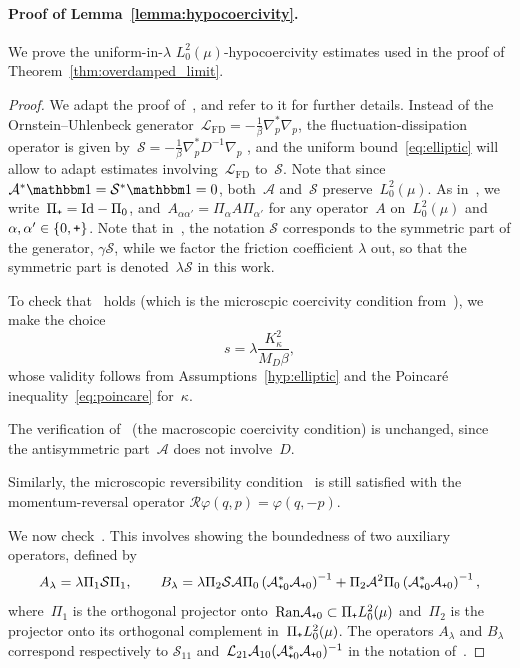 \documentclass[10pt]{article}
\newcommand{\cL}{\mathcal{L}}
\newcommand{\cR}{\mathcal{R}}
\newcommand{\cA}{\mathcal{A}}
\newcommand{\cS}{\mathcal{S}}
\newcommand{\cLham}{\mathcal A}
\newcommand{\cLou}{\mathcal S}
\newcommand{\wLmuz}{L^2_0(\mu)}
\newcommand{\subplus}{\textnormal{\texttt{+}}}
\newcommand{\1}{\mathbbm 1}
\newcommand{\Id}{\mathrm{Id}}
\begin{document}
\paragraph{Proof of Lemma~\ref{lemma:hypocoercivity}.}
We prove the uniform-in-$\lambda$ $\wLmuz$-hypocoercivity estimates used in the proof of Theorem~\ref{thm:overdamped_limit}.
\begin{proof}
    We adapt the proof of~\cite[Theorem 3.3]{BFLS22}, and refer to it for further details. Instead of the Ornstein--Uhlenbeck generator~$\mathcal L_{\mathrm{FD}} = -\frac1\beta\nabla_p^*\nabla_p$, the fluctuation-dissipation operator is given by~$\cLou = -\frac1\beta\nabla_p^* D^{-1}\nabla_p$ , and the uniform bound~\eqref{eq:elliptic} will allow to adapt estimates involving~$\cL_{\mathrm{FD}}$ to~$\cLou$.
    Note that since~$\cLham^* \1 = \cLou^* \1 = 0$, both~$\cLham$ and~$\cLou$ preserve~$\wLmuz$.
    As in~\cite{BFLS22}, we write~$\Pi_{\subplus}=\Id-\Pi_0$, and~$A_{\alpha\alpha'}=\Pi_\alpha A\Pi_{\alpha'}$ for any operator~$A$ on~$\wLmuz$ and~$\alpha,\alpha'\in\{0,\subplus\}$. Note that in~\cite[Theorem 3.3]{BFLS22}, the notation $\cS$ corresponds to the symmetric part of the generator, $\gamma\cLou$, while we factor the friction coefficient $\lambda$ out, so that the symmetric part is denoted~$\lambda\cS$ in this work.
    
    To check that~\cite[Assumption 2.2]{BFLS22} holds (which is the microscpic coercivity condition from~\cite{DMS15}), we make the choice
    \begin{equation}
        \label{eq:s_bound}
        s = \lambda\frac{K_\kappa^2}{M_D \beta},
    \end{equation}
    whose validity follows from Assumptions~\ref{hyp:elliptic} and the Poincar\'e inequality~\eqref{eq:poincare} for~$\kappa$.

    The verification of~\cite[Assumption 2.3]{BFLS22} (the macroscopic coercivity condition) is unchanged, since the antisymmetric part~$\cLham$ does not involve~$D$.
    
    Similarly, the microscopic reversibility condition~\cite[Assumption 2.5]{BFLS22} is still satisfied with the momentum-reversal operator $\cR\varphi(q,p)=\varphi(q,-p)$.

    We now check~\cite[Assumption 2.6]{BFLS22}. This involves showing the boundedness of two auxiliary operators, defined by
    \begin{equation}
        A_\lambda=\lambda\Pi_1\cLou\Pi_1,\qquad B_\lambda=\lambda\Pi_2\cLou\cLham\Pi_0\left(\cLham_{\subplus 0}^*\cLham_{\subplus 0}\right)^{-1}+\Pi_2\cLham^2\Pi_0\left(\cLham_{\subplus 0}^*\cLham_{\subplus 0}\right)^{-1},
    \end{equation}
    where~$\Pi_1$ is the orthogonal projector onto~$\mathrm{Ran}\cLham_{\subplus 0} \subset \Pi_{\subplus}\wLmuz$ and~$\Pi_2$ is the projector onto its orthogonal complement in~$\Pi_{\subplus}\wLmuz$.
    The operators $A_\lambda$ and $B_\lambda$ correspond respectively to $\cS_{11}$ and~$\cL_{21}\cA_{10}(\cA_{\subplus 0}^*\cA_{\subplus 0})^{-1}$ in the notation of~\cite{BFLS22}.
    

\end{proof}
\end{document}
